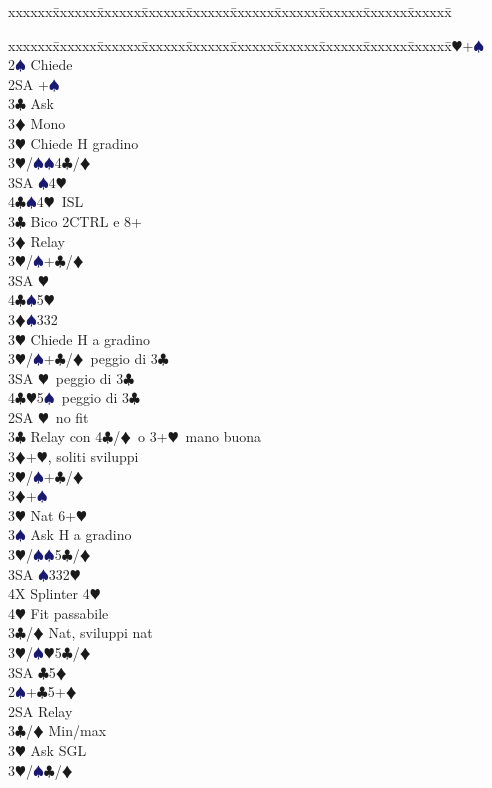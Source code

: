 \documentclass[a4paper,italian]{article}
\newcommand{\BC}{\textcolor{OliveGreen}{$\clubsuit$}}
\newcommand{\BD}{\textcolor{RedOrange}{$\vardiamondsuit$}}
\newcommand{\BH}{\textcolor{Red2}{$\varheartsuit${}}}
\newcommand{\BS}{\textcolor{MidnightBlue}{$\spadesuit${}}}
\newenvironment{bidtable}
{\begin{tabbing}

    xxxxxx\=xxxxxx\=xxxxxx\=xxxxxx\=xxxxxx\=xxxxxx\=xxxxxx\=xxxxxx\=xxxxxx\=xxxxxx\=\kill}
{\end{tabbing} }%
\begin{document}
\begin{multicols}{2}
\begin{bidtable}
    \end{bidtable}
    \columnbreak
    \begin{bidtable}
        2\BH {}+\BS \+\\
        2\BS \> Chiede\+\\
        2SA +\BS \+\\
        3\BC \> Ask\+\\
        3\BD \> Mono\+\\
        3\BH \> Chiede H gradino\-\\
        3\BH/\BS {}\BS 4\BC /\BD \\
        3SA \BS 4\BH \\
        4\BC {}\BS 4\BH\ ISL\-\-\\
        3\BC \> Bico 2CTRL e 8+\+\\
        3\BD \> Relay\+\\
        3\BH/\BS {}+\BC /\BD \\
        3SA \BH \\
        4\BC {}\BS 5\BH \-\-\\
        3\BD {}\BS 332\+\\
        3\BH \> Chiede H a gradino\-\\
        3\BH/\BS {}+\BC /\BD\ peggio di 3\BC \\
        3SA \BH\ peggio di 3\BC \\
        4\BC {}\BH 5\BS\ peggio di 3\BC \-\\
        2SA \BH\ no fit\+\\
        3\BC \> Relay con 4\BC/\BD\ o 3+\BH\ mano buona\+\\
        3\BD {}+\BH, soliti sviluppi\\
        3\BH/\BS {}+\BC /\BD \-\\
        3\BD {}+\BS \+\\
        3\BH \> Nat 6+\BH\\
        3\BS \> Ask H a gradino\-\\
        3\BH/\BS {}\BS 5\BC /\BD \\
        3SA \BS 332\BH \\
        4X \> Splinter 4\BH \\
        4\BH \> Fit passabile\-\\
        3\BC/\BD \> Nat, sviluppi nat\\
        3\BH/\BS {}\BH 5\BC /\BD \\
        3SA \BC 5\BD \-\\
        2\BS {}+\BC 5+\BD \+\\
        2SA \> Relay\+\\
        3\BC/\BD \> Min/max\+\\
        3\BH \> Ask SGL\-\\
        3\BH/\BS {}\BC /\BD
    \end{bidtable}
\end{multicols}
\end{document}
